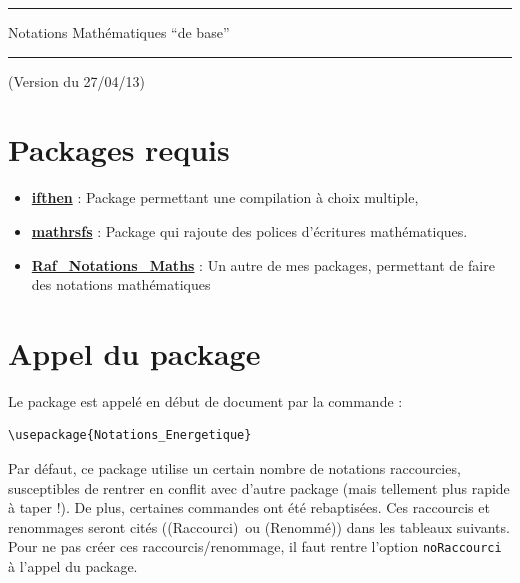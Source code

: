 \documentclass[a4paper,10pt]{article}
\newcommand{\rac}{({\color{red}Raccourci})}
\newcommand{\ren}{({\color{blue}Renommé})}
\begin{document}
	\begin{center}
		\hrule{\Large Notations Mathématiques ``de base''}\\\hrule
	\end{center}

	(Version du 27/04/13)

	\section{Packages requis}

	\begin{itemize}
		\item \href{http://www.ctan.org/pkg/ifthen}{\textbf{ifthen}} : Package permettant une compilation à choix multiple,
		\item \href{http://www.ctan.org/pkg/mathrsfs}{\textbf{mathrsfs}} : Package qui rajoute des polices d'écritures mathématiques.
		\item \href{http://enseignement.allais.eu/page-latex}{\textbf{Raf\_Notations\_Maths}} : Un autre de mes packages, permettant de faire des notations mathématiques
	\end{itemize}

	\section{Appel du package}

	Le package est appelé en début de document par la commande :
	\begin{verbatim}
\usepackage{Notations_Energetique}
	\end{verbatim}

	Par défaut, ce package utilise un certain nombre de notations raccourcies, susceptibles de rentrer en conflit avec d'autre package (mais tellement plus rapide à taper !).
	De plus, certaines commandes ont été rebaptisées.
	Ces raccourcis et renommages seront cités (\rac\ ou \ren) dans les tableaux suivants.
	Pour ne pas créer ces raccourcis/renommage, il faut rentre l'option \verb!noRaccourci! à l'appel du package.
\end{document}
